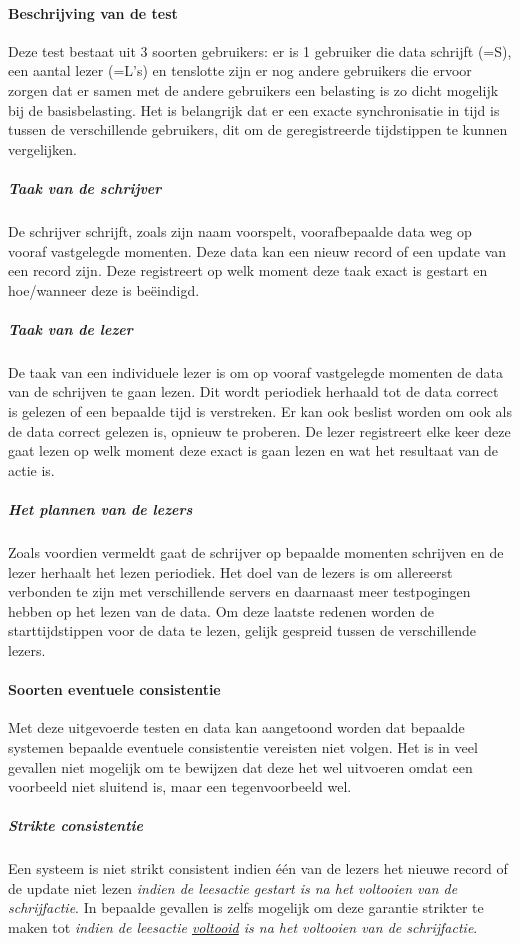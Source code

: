 \paragraph{Beschrijving van de test} Deze test bestaat uit 3 soorten gebruikers: er is 1 gebruiker die data schrijft (=S), een aantal lezer (=L's) en tenslotte zijn er nog andere gebruikers die ervoor zorgen dat er samen met de andere gebruikers een belasting is zo dicht mogelijk bij de basisbelasting. 
Het is belangrijk dat er een exacte synchronisatie in tijd is tussen de verschillende gebruikers, dit om de geregistreerde tijdstippen te kunnen vergelijken.

\subparagraph{Taak van de schrijver} De schrijver schrijft, zoals zijn naam voorspelt, voorafbepaalde data weg op vooraf vastgelegde momenten. Deze data kan een nieuw record of een update van een record zijn. Deze registreert op welk moment deze taak exact is gestart en hoe/wanneer deze is beëindigd.

\subparagraph{Taak van de lezer} De taak van een individuele lezer is om op vooraf vastgelegde momenten de data van de schrijven te gaan lezen. Dit wordt periodiek herhaald tot de data correct is gelezen of een bepaalde tijd is verstreken. Er kan ook beslist worden om ook als de data correct gelezen is, opnieuw te proberen. De lezer registreert elke keer deze gaat lezen op welk moment deze exact is gaan lezen en wat het resultaat van de actie is.  

\subparagraph{Het plannen van de lezers} Zoals voordien vermeldt gaat de schrijver op bepaalde momenten schrijven en de lezer herhaalt het lezen periodiek. Het doel van de lezers is om allereerst verbonden te zijn met verschillende servers en daarnaast meer testpogingen hebben op het lezen van de data. Om deze laatste redenen worden de starttijdstippen voor de data te lezen, gelijk gespreid tussen de verschillende lezers. 

\paragraph{Soorten eventuele consistentie} Met deze uitgevoerde testen en data kan aangetoond worden dat bepaalde systemen bepaalde eventuele consistentie vereisten niet volgen. Het is in veel gevallen niet mogelijk om te bewijzen dat deze het wel uitvoeren omdat een voorbeeld niet sluitend is, maar een tegenvoorbeeld wel. 

\subparagraph{Strikte consistentie} Een systeem is niet strikt consistent indien één van de lezers het nieuwe record of de update niet lezen \textit{indien de leesactie gestart is na het voltooien van de schrijfactie}. In bepaalde gevallen is zelfs mogelijk om deze garantie strikter te maken tot \textit{indien de leesactie \underline{voltooid} is na het voltooien van de schrijfactie}. 

